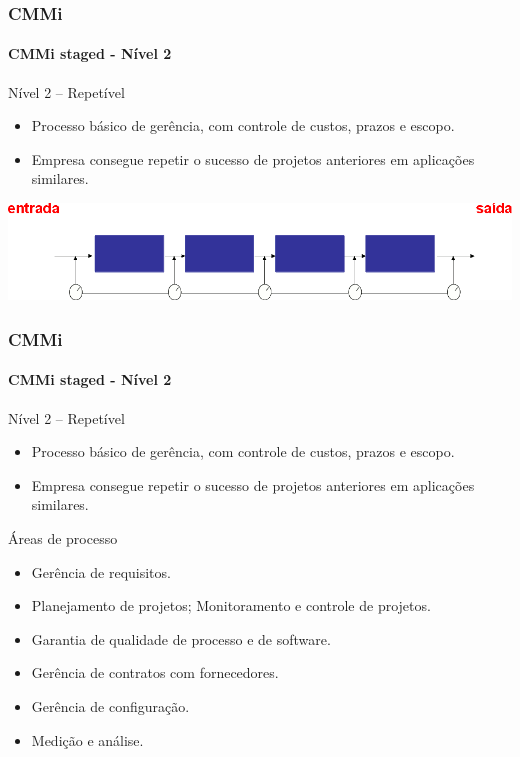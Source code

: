 \begin{frame}
	\frametitle{CMMi}
	\framesubtitle{CMMi staged - Nível 2}
	
	\begin{block:fact}{Nível 2 -- Repetível}
		\begin{itemize}
		 \item Processo básico de gerência, com controle de custos, prazos e escopo.
		 \item Empresa consegue repetir o sucesso de projetos anteriores em aplicações
		 similares.
		\end{itemize}
	\end{block:fact}
	
	\begin{block:fact}{}
		\centering
		\includegraphics[width=\textwidth]{software-engineering/project-management/process/process-quality/cmmi/cmmi-staged-2}
	\end{block:fact}
\end{frame}


\begin{frame}
	\frametitle{CMMi}
	\framesubtitle{CMMi staged - Nível 2}
	
	\begin{block:fact}{Nível 2 -- Repetível}
		\begin{itemize}
			\item Processo básico de gerência, com controle de custos, prazos e escopo.
			\item Empresa consegue repetir o sucesso de projetos anteriores em aplicações
			similares.
		\end{itemize}
	\end{block:fact}
	
	\begin{block:fact}{Áreas de processo}
		\begin{itemize}
			\small
			\item Gerência de requisitos.
			\item Planejamento de projetos; Monitoramento e controle de projetos.
			\item Garantia de qualidade de processo e de software.
			\item Gerência de contratos com fornecedores.
			\item Gerência de configuração.
			\item Medição e análise.
		\end{itemize}
	\end{block:fact}
\end{frame}

